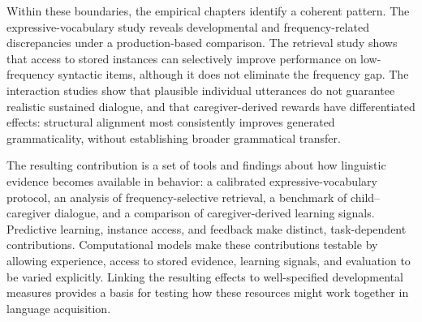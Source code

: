 Within these boundaries, the empirical chapters identify a coherent pattern. The expressive-vocabulary study reveals developmental and frequency-related discrepancies under a production-based comparison. The retrieval study shows that access to stored instances can selectively improve performance on low-frequency syntactic items, although it does not eliminate the frequency gap. The interaction studies show that plausible individual utterances do not guarantee realistic sustained dialogue, and that caregiver-derived rewards have differentiated effects: structural alignment most consistently improves generated grammaticality, without establishing broader grammatical transfer.

The resulting contribution is a set of tools and findings about how linguistic evidence becomes available in behavior: a calibrated expressive-vocabulary protocol, an analysis of frequency-selective retrieval, a benchmark of child--caregiver dialogue, and a comparison of caregiver-derived learning signals. Predictive learning, instance access, and feedback make distinct, task-dependent contributions. Computational models make these contributions testable by allowing experience, access to stored evidence, learning signals, and evaluation to be varied explicitly. Linking the resulting effects to well-specified developmental measures provides a basis for testing how these resources might work together in language acquisition.
